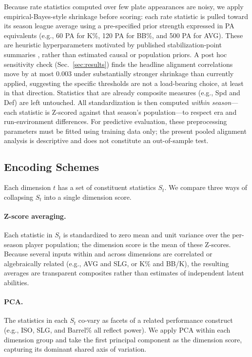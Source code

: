 \documentclass[10pt,twocolumn,letterpaper]{article}
\begin{document}
Because rate statistics computed over few plate appearances are noisy, we apply empirical-Bayes-style shrinkage before scoring: each rate statistic is pulled toward its season league average using a pre-specified prior strength expressed in PA equivalents (e.g., 60 PA for K\%, 120 PA for BB\%, and 500 PA for AVG). These are heuristic hyperparameters motivated by published stabilization-point summaries \cite{fangraphsSampleSize}, rather than estimated causal or population priors. A post hoc sensitivity check (Sec.~\ref{sec:results}) finds the headline alignment correlations move by at most 0.003 under substantially stronger shrinkage than currently applied, suggesting the specific thresholds are not a load-bearing choice, at least in that direction. Statistics that are already composite measures (e.g., Spd and Def) are left untouched. All standardization is then computed \emph{within season}---each statistic is Z-scored against that season's population---to respect era and run-environment differences. For predictive evaluation, these preprocessing parameters must be fitted using training data only; the present pooled alignment analysis is descriptive and does not constitute an out-of-sample test.

\subsection{Encoding Schemes}
Each dimension $t$ has a set of constituent statistics $S_t$. We compare three ways of collapsing $S_t$ into a single dimension score.

\paragraph{Z-score averaging.}
Each statistic in $S_t$ is standardized to zero mean and unit variance over the per-season player population; the dimension score is the mean of these Z-scores. Because several inputs within and across dimensions are correlated or algebraically related (e.g., AVG and SLG, or K\% and BB/K), the resulting averages are transparent composites rather than estimates of independent latent abilities.

\paragraph{PCA.}
The statistics in each $S_t$ co-vary as facets of a related performance construct (e.g., ISO, SLG, and Barrel\% all reflect power). We apply PCA within each dimension group and take the first principal component as the dimension score, capturing its dominant shared axis of variation.
\end{document}
